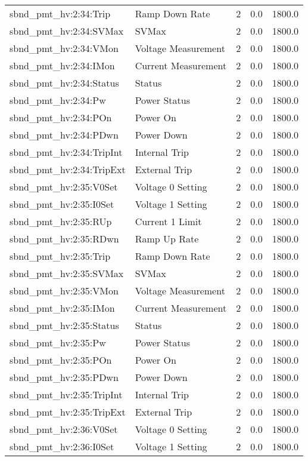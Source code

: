 \begin{center}
\begin{longtable}{l | l l l l }
sbnd\_pmt\_hv:2:34:Trip & Ramp Down Rate & 2 & 0.0 & 1800.0\\ 
sbnd\_pmt\_hv:2:34:SVMax & SVMax & 2 & 0.0 & 1800.0\\ 
sbnd\_pmt\_hv:2:34:VMon & Voltage Measurement & 2 & 0.0 & 1800.0\\ 
sbnd\_pmt\_hv:2:34:IMon & Current Measurement & 2 & 0.0 & 1800.0\\ 
sbnd\_pmt\_hv:2:34:Status & Status & 2 & 0.0 & 1800.0\\ 
sbnd\_pmt\_hv:2:34:Pw & Power Status & 2 & 0.0 & 1800.0\\ 
sbnd\_pmt\_hv:2:34:POn & Power On & 2 & 0.0 & 1800.0\\ 
sbnd\_pmt\_hv:2:34:PDwn & Power Down & 2 & 0.0 & 1800.0\\ 
sbnd\_pmt\_hv:2:34:TripInt & Internal Trip & 2 & 0.0 & 1800.0\\ 
sbnd\_pmt\_hv:2:34:TripExt & External Trip & 2 & 0.0 & 1800.0\\ 
sbnd\_pmt\_hv:2:35:V0Set & Voltage 0 Setting & 2 & 0.0 & 1800.0\\ 
sbnd\_pmt\_hv:2:35:I0Set & Voltage 1 Setting & 2 & 0.0 & 1800.0\\ 
sbnd\_pmt\_hv:2:35:RUp & Current 1 Limit & 2 & 0.0 & 1800.0\\ 
sbnd\_pmt\_hv:2:35:RDwn & Ramp Up Rate & 2 & 0.0 & 1800.0\\ 
sbnd\_pmt\_hv:2:35:Trip & Ramp Down Rate & 2 & 0.0 & 1800.0\\ 
sbnd\_pmt\_hv:2:35:SVMax & SVMax & 2 & 0.0 & 1800.0\\ 
sbnd\_pmt\_hv:2:35:VMon & Voltage Measurement & 2 & 0.0 & 1800.0\\ 
sbnd\_pmt\_hv:2:35:IMon & Current Measurement & 2 & 0.0 & 1800.0\\ 
sbnd\_pmt\_hv:2:35:Status & Status & 2 & 0.0 & 1800.0\\ 
sbnd\_pmt\_hv:2:35:Pw & Power Status & 2 & 0.0 & 1800.0\\ 
sbnd\_pmt\_hv:2:35:POn & Power On & 2 & 0.0 & 1800.0\\ 
sbnd\_pmt\_hv:2:35:PDwn & Power Down & 2 & 0.0 & 1800.0\\ 
sbnd\_pmt\_hv:2:35:TripInt & Internal Trip & 2 & 0.0 & 1800.0\\ 
sbnd\_pmt\_hv:2:35:TripExt & External Trip & 2 & 0.0 & 1800.0\\ 
sbnd\_pmt\_hv:2:36:V0Set & Voltage 0 Setting & 2 & 0.0 & 1800.0\\ 
sbnd\_pmt\_hv:2:36:I0Set & Voltage 1 Setting & 2 & 0.0 & 1800.0\\ 

\end{longtable}
\end{center}
